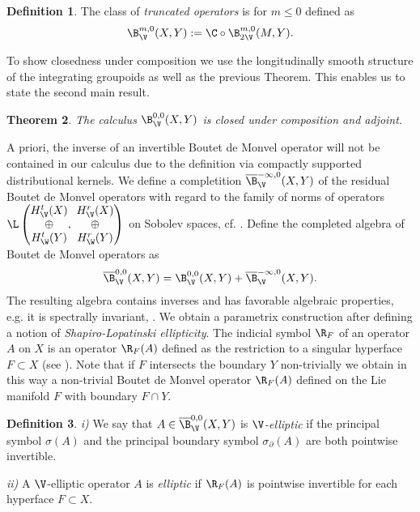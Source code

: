 \documentclass[10pt, reqno]{amsart}
\newtheorem{Thm}{Theorem}[section]
\theoremstyle{definition}
\newtheorem{Def}[Thm]{Definition}
\begin{document}
\begin{Def}
The class of \emph{truncated operators} is for $m \leq 0$ defined as
\[
\B_{\V}^{m,0}(X, Y) := \C \circ \B_{2\V}^{m,0}(M, Y).
\]
\label{Def:truncated}
\end{Def}

To show closedness under composition we use the longitudinally smooth structure of the integrating groupoids
as well as the previous Theorem.
This enables us to state the second main result.

\begin{Thm}
The calculus $\B_{\V}^{0,0}(X, Y)$ is closed under composition and adjoint. 
\end{Thm}

A priori, the inverse of an invertible Boutet de Monvel operator will not be contained in our calculus due to the definition via compactly supported distributional kernels. 
We define a completition $\overline{\B}_{\V}^{-\infty,0}(X, Y)$ of the residual Boutet de Monvel operators with regard to the family of norms
of operators $\L\left(\begin{matrix} H_{\V}^t(X) \\ \oplus \\ H_{\W}^t(Y) \end{matrix}, \ \begin{matrix} H_{\V}^r(X) \\ \oplus \\ H_{\W}^r(Y) \end{matrix}\right)$ on Sobolev spaces, cf. \cite{ALNV}.
Define the completed algebra of Boutet de Monvel operators as
\[
\overline{\B}_{\V}^{0,0}(X, Y) = \B_{\V}^{0,0}(X, Y) + \overline{\B}_{\V}^{-\infty, 0}(X, Y).
\]
The resulting algebra contains inverses and has favorable algebraic properties, e.g. it is spectrally invariant, \cite{B2}. 
We obtain a parametrix construction after defining a notion of \emph{Shapiro-Lopatinski ellipticity}.
The indicial symbol $\R_{F}$ of an operator $A$ on $X$ is an operator $\R_{F}(A)$ defined as the restriction to a singular hyperface $F \subset X$ (see \cite{ALN}). 
Note that if $F$ intersects the boundary $Y$ non-trivially we obtain in this way a non-trivial Boutet de Monvel
operator $\R_F(A)$ defined on the Lie manifold $F$ with boundary $F \cap Y$. 

\begin{Def}
\emph{i)} We say that $A \in \overline{\B}_{\V}^{0,0}(X, Y)$ is \emph{$\V$-elliptic} if the principal symbol $\sigma(A)$ and the principal boundary symbol $\sigma_{\partial}(A)$ are 
both pointwise invertible.

\emph{ii)} A $\V$-elliptic operator $A$ is \emph{elliptic} if $\R_F(A)$ is pointwise invertible for each hyperface $F \subset X$. 
\label{Def:elliptic}
\end{Def}
\end{document}
